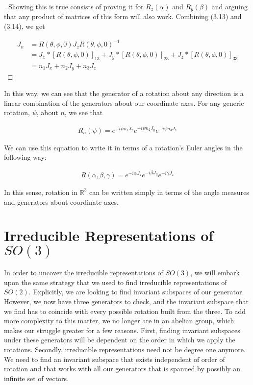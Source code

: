 \documentclass[10pt]{ucthesis}
\newcommand{\R}{\mathbb{R}}
\begin{document}
\begin{proof}[\cite{Tung}]
Showing this is true consists of proving it for $R_z(\alpha)$ and $R_y(\beta)$ and arguing that any product of matrices of this form will also work. Combining (3.13) and (3.14), we get 

\begin{equation}
	\begin{aligned}
		J_n &= R(\theta,\phi,0)J_z R(\theta,\phi,0)^{-1} \\
			&= J_x * [R(\theta,\phi,0)]_{13} + J_y * [R(\theta,\phi,0)]_{23}  +J_z * [R(\theta,\phi,0)]_{33}\\
			 &= n_1J_x + n_2J_y + n_3J_z 
	\end{aligned}
\end{equation} 
\end{proof}

In this way, we can see that the generator of a rotation about any direction is a linear combination of the generators about our coordinate axes. For any generic rotation, $\psi$, about $n$, we see that 

\begin{equation}
	\begin{aligned}
		R_n(\psi) = e^{-i\psi n_1J_x}e^{-i\psi n_2J_y}e^{-i\psi n_3J_z}
	\end{aligned}
\end{equation} 

We can use this equation to write it in terms of a rotation's Euler angles in the following way:

\begin{equation}
	\begin{aligned}
		R(\alpha,\beta,\gamma) = e^{-i\alpha J_z}e^{-i\beta J_y}e^{-i\gamma J_z}
	\end{aligned}
\end{equation} 

In this sense, rotation in $\R^3$ can be written simply in terms of the angle measures and generators about coordinate axes.

\section{Irreducible Representations of $SO(3)$}

In order to uncover the irreducible representations of $SO(3)$, we will embark upon the same strategy that we used to find irreducible representations of $SO(2)$. Explicitly, we are looking to find invariant subspaces of our generator. However, we now have three generators to check, and the invariant subspace that we find has to coincide with every possible rotation built from the three. To add more complexity to this matter, we no longer are in an abelian group, which makes our struggle greater for a few reasons. First, finding invariant subspaces under these generators will be dependent on the order in which we apply the rotations. Secondly, irreducible representations need not be degree one anymore. We need to find an invariant subspace that exists independent of order of rotation and that works with all our generators that is spanned by possibly an infinite set of vectors.
\end{document}
